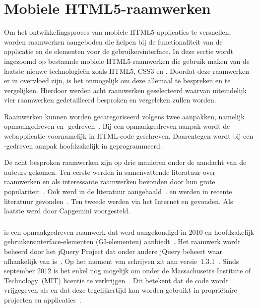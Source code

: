 \section{Mobiele HTML5-raamwerken}
\label{sec:mobiele-html5-raamwerken}

Om het ontwikkelingsproces van mobiele HTML5-applicaties te versnellen, worden raamwerken aangeboden die helpen bij de functionaliteit van de applicatie en de elementen voor de gebruikersinterface.
In deze sectie wordt ingezoomd op bestaande mobiele HTML5-raamwerken die gebruik maken van de laatste nieuwe technologieën zoals HTML5, CSS3 en \js{}.
Doordat deze raamwerken er in overvloed zijn, is het onmogelijk om deze allemaal te bespreken en te vergelijken.
Hierdoor werden acht raamwerken geselecteerd waarvan uiteindelijk vier raamwerken gedetailleerd besproken en vergeleken zullen worden.

Raamwerken kunnen worden gecategoriseerd volgens twee aanpakken, namelijk opmaakgedreven en \js{}-gedreven~\cite{Oeflman2011}.
Bij een opmaakgedreven aanpak wordt de webapplicatie voornamelijk in HTML-code geschreven. 
Daarentegen wordt bij een \js{}-gedreven aanpak hoofdzakelijk in \js{} geprogrammeerd.

De acht besproken raamwerken zijn op drie manieren onder de aandacht van de auteurs gekomen.
Ten eerste werden in samenvattende literatuur over raamwerken \jqm{} en \st{} als interessante raamwerken bevonden door hun grote populariteit~\cite{Firtman2013,Hales2012,Oeflman2011,David2011}.
Ook \tmp{} werd in de literatuur aangehaald~\cite{Firtman2013}.
\lungo{} en \jqt{} werden in recente literatuur gevonden~\cite{Firtman2013,Hales2012}.
Ten tweede werden via het Internet \kendo{} en \moobile{} gevonden.
Als laatste werd door Capgemini \davinci{} voorgesteld.


\subsubsection{\jqm} %
\jqm{} is een opmaakgedreven raamwerk dat werd aangekondigd in 2010 en hoofdzakelijk gebruikersinterface-elementen (GI-elementen) aanbiedt~\cite{Resig2010}.
Het raamwerk wordt beheerd door het jQuery Project dat onder andere jQuery beheert waar \jqm{} afhankelijk van is~\cite{JQuery2012}. 
Op het moment van schrijven zit \jqm{} aan versie~1.3.1~\cite{Parker2013b}. 
Sinds september 2012 is het enkel nog mogelijk om \jqm{} onder de Massachusetts Institute of Technology~(MIT) licentie te verkrijgen~\cite{Dmethvin2012}. 
Dit betekent dat de code wordt vrijgegeven als  en dat deze tegelijkertijd kan worden gebruikt in propriëtaire projecten en applicaties~\cite{PhilDutson2012}.

